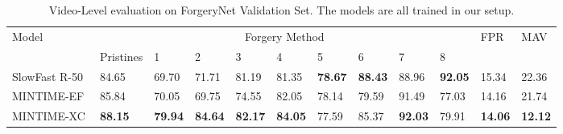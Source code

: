 \documentclass[10pt,twocolumn,letterpaper]{article}
\begin{document}
\begin{table*}
    \centering
    \begin{tabular}{llllllllllll}
    \hline
        Model & \multicolumn{9}{c}{Forgery Method} & FPR & MAV \\
        ~ & Pristines & 1 & 2 & 3 &  4 & 5 & 6 & 7 & 8 & ~\\ \hline
SlowFast R-50~\cite{Feichtenhofer_2019_ICCV} & 84.65 & 69.70 & 71.71 & 81.19 & 81.35 & \textbf{78.67} & \textbf{88.43} & 88.96 & \textbf{92.05} & 15.34 & 22.36\\
        MINTIME-EF & 85.84 & 70.05 & 69.75 & 74.55 & 82.05 & 78.14 & 79.59 & 91.49 & 77.03 & 14.16 & 21.74 \\ 
        MINTIME-XC & \textbf{88.15} & \textbf{79.94} & \textbf{84.64} & \textbf{82.17} & \textbf{84.05} & 77.59 & 85.37 & \textbf{92.03} & 79.91 & \textbf{14.06} & \textbf{12.12} \\ \hline
    \end{tabular}
    \caption{Video-Level evaluation on ForgeryNet Validation Set. The models are all trained in our setup.}
    \label{tab:forgerynet_methods}
\end{table*}
\begin{table}
    \centering
     \caption{Cross-Forgery Evaluation on ForgeryNet Validation Set. X3D-M and SlowFast R-50 results are taken from \cite{forgerynet}.}
    \label{tab:cross_forgery}
\end{table}
\end{document}
